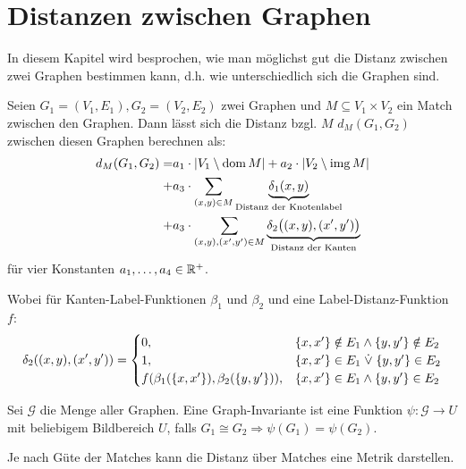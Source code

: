 \chapter{Distanzen zwischen Graphen}

In diesem Kapitel wird besprochen, wie man möglichst gut die Distanz zwischen zwei Graphen bestimmen kann, d.h. wie unterschiedlich sich die Graphen sind.

\begin{definition}
    Seien $ G_1 = (V_1, E_1), G_2 = (V_2, E_2) $ zwei Graphen und $ M \subseteq V_1 \times V_2 $ ein Match zwischen den Graphen.
    Dann lässt sich die Distanz bzgl. $ M $ $ d_M(G_1, G_2) $ zwischen diesen Graphen berechnen als:
    \begin{align*}
        d_M(G_1, G_2) = & a_1 \cdot | V_1 \setminus \operatorname*{dom} M | + a_2 \cdot |V_2 \setminus \operatorname*{img} M| \\
        + & a_3 \cdot \sum_{(x,y) \in M} \underbrace{\delta_1(x, y)}_{\text{Distanz der Knotenlabel}} \\
        + & a_3 \cdot \sum_{(x,y), (x',y') \in M} \underbrace{\delta_2\big((x,y), (x', y')\big)}_{\text{Distanz der Kanten}}
    \end{align*}
    für vier Konstanten $ a_1, \dots, a_4 \in \mathbb{R}^+ $.

    Wobei für Kanten-Label-Funktionen $ \beta_1 $ und $ \beta_2 $ und eine Label-Distanz-Funktion $ f $:
    \begin{equation*}
        \delta_2((x, y), (x', y')) = \begin{cases}
            0, & \{ x, x'\} \notin E_1 \land \{ y, y' \} \notin E_2 \\
            1, & \{ x, x' \} \in E_1 \mathrel{\dot{\lor}} \{ y, y' \} \in E_2 \\
            f(\beta_1(\{ x, x' \}), \beta_2(\{ y, y' \})), & \{ x, x'\} \in E_1 \land \{ y, y' \} \in E_2
        \end{cases}
    \end{equation*}
\end{definition}

\begin{definition}
    Sei $ \mathcal{G} $ die Menge aller Graphen.
    Eine Graph-Invariante ist eine Funktion $ \psi: \mathcal G \rightarrow U $ mit beliebigem Bildbereich $ U $, falls $ G_1 \cong G_2 \Rightarrow \psi(G_1) = \psi(G_2) $.
\end{definition}

\begin{remark}
    Je nach Güte der Matches kann die Distanz über Matches eine Metrik darstellen.
\end{remark}

